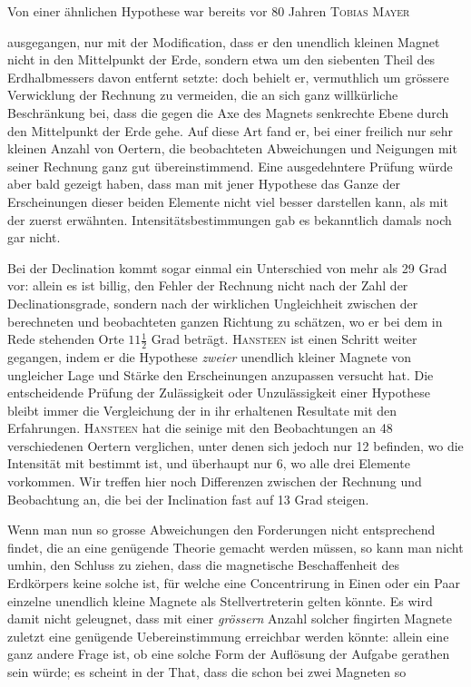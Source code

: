 Von einer ähnlichen Hypothese war bereits vor 80 Jahren \textsc{Tobias Mayer} \par
\clearpage
{}
\noindent ausgegangen, nur mit der Modification, dass er den unendlich kleinen Magnet nicht in den Mittelpunkt der Erde, sondern etwa um den siebenten Theil des Erdhalbmessers davon entfernt setzte: doch behielt er, vermuthlich um grössere Verwicklung der Rechnung zu vermeiden, die an sich ganz willkürliche Beschränkung bei, dass die gegen die Axe des Magnets senkrechte Ebene durch den Mittelpunkt der Erde gehe. Auf diese Art fand er, bei einer freilich nur sehr kleinen Anzahl von Oertern, die beobachteten Abweichungen und Neigungen mit seiner Rechnung ganz gut übereinstimmend. Eine ausgedehntere Prüfung würde aber bald gezeigt haben, dass man mit jener Hypothese das Ganze der Erscheinungen dieser beiden Elemente nicht viel besser darstellen kann, als mit der zuerst erwähnten. Intensitätsbestimmungen gab es bekanntlich damals noch gar nicht.

\expandafter\def\csname HistoricalNoteText14\endcsname{Bei der Declination kommt sogar einmal ein Unterschied von mehr als 29 Grad vor: allein es ist billig, den Fehler der Rechnung nicht nach der Zahl der Declinationsgrade, sondern nach der wirklichen Ungleichheit zwischen der berechneten und beobachteten ganzen Richtung zu schätzen, wo er bei dem in Rede stehenden Orte $11\frac{1}{2}$ Grad beträgt.}
\textsc{Hansteen} ist einen Schritt weiter gegangen, indem er die Hypothese \textit{zweier} unendlich kleiner Magnete von ungleicher Lage und Stärke den Erscheinungen anzupassen versucht hat. Die entscheidende Prüfung der Zulässigkeit oder Unzulässigkeit einer Hypothese bleibt immer die Vergleichung der in ihr erhaltenen Resultate mit den Erfahrungen. \textsc{Hansteen} hat die seinige mit den Beobachtungen an 48 verschiedenen Oertern verglichen, unter denen sich jedoch nur 12 befinden, wo die Intensität mit bestimmt ist, und überhaupt nur 6, wo alle drei Elemente vorkommen. Wir treffen hier noch Differenzen zwischen der Rechnung und Beobachtung an, die bei der Inclination fast auf 13 Grad steigen.

Wenn man nun so grosse Abweichungen den Forderungen nicht ent\-sprechend findet, die an eine genügende Theorie gemacht werden müssen, so kann man nicht umhin, den Schluss zu ziehen, dass die magnetische Beschaffenheit des Erdkörpers keine solche ist, für welche eine Concentrirung in Einen oder ein Paar einzelne unendlich kleine Magnete als Stellvertreterin gelten könnte. Es wird damit nicht geleugnet, dass mit einer \textit{grössern} Anzahl solcher fingirten Magnete zuletzt eine genügende Uebereinstimmung erreichbar werden könnte: allein eine ganz andere Frage ist, ob eine solche Form der Auflösung der Aufgabe gerathen sein würde; es scheint in der That, dass die schon bei zwei Magneten so
